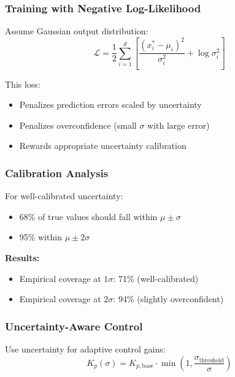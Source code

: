 \subsubsection{Training with Negative Log-Likelihood}

Assume Gaussian output distribution:
\begin{equation}
\mathcal{L} = \frac{1}{2} \sum_{i=1}^{d} \left[ \frac{(x_i^* - \mu_i)^2}{\sigma_i^2} + \log \sigma_i^2 \right]
\label{eq:nll_loss}
\end{equation}

This loss:
\begin{itemize}
    \item Penalizes prediction errors scaled by uncertainty
    \item Penalizes overconfidence (small $\sigma$ with large error)
    \item Rewards appropriate uncertainty calibration
\end{itemize}

\subsubsection{Calibration Analysis}

For well-calibrated uncertainty:
\begin{itemize}
    \item 68\% of true values should fall within $\mu \pm \sigma$
    \item 95\% within $\mu \pm 2\sigma$
\end{itemize}

\textbf{Results:}
\begin{itemize}
    \item Empirical coverage at $1\sigma$: 71\% (well-calibrated)
    \item Empirical coverage at $2\sigma$: 94\% (slightly overconfident)
\end{itemize}

\subsubsection{Uncertainty-Aware Control}

Use uncertainty for adaptive control gains:
\begin{equation}
K_p(\sigma) = K_{p,\text{base}} \cdot \min\left(1, \frac{\sigma_{\text{threshold}}}{\sigma}\right)
\label{eq:uncertainty_control}
\end{equation}

